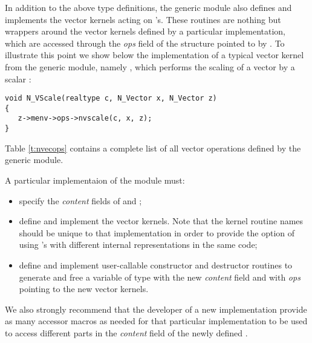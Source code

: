 In addition to the above type definitions, the generic {\nvector} module
also defines and implements the vector kernels acting on 's.
These routines are nothing but wrappers around the vector kernels defined by
a particular {\nvector} implementation, which are accessed through the {\em ops}
field of the structure pointed to by . To illustrate this point we
show below the implementation of a typical vector kernel from the
generic {\nvector} module, namely , which performs the scaling of a
vector  by a scalar :
\begin{verbatim}
void N_VScale(realtype c, N_Vector x, N_Vector z) 
{
   z->menv->ops->nvscale(c, x, z);
}
\end{verbatim}
Table \ref{t:nvecops} contains a complete list of all vector operations defined
by the generic {\nvector} module.


A particular implementaion of the {\nvector} module must:
\begin{itemize}
\item specify the {\em content} fields of  and ;
\item define and implement the vector kernels. Note that the kernel routine 
  names should be unique to that implementation in order 
  to provide the option of using 's with different 
  internal representations in the same code;
\item define and implement user-callable constructor and destructor
  routines to generate and free a variable of type  with
  the new {\em content} field and with {\em ops} pointing to the
  new vector kernels.
\end{itemize}
We also strongly recommend that the developer of a new 
{\nvector} implementation provide as many accessor macros 
as needed for that particular implementation to 
be used to access different parts in the {\em content} field
of the newly defined .



\newpage
\bigskip
\newlength{\colone}
\newlength{\coltwo}
\setlength{\coltwo}{\textwidth}
\addtolength{\coltwo}{-0.5in}
\addtolength{\coltwo}{-\colone}

